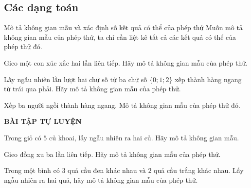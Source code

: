 \subsection{Các dạng toán}
\begin{dang}{Mô tả không gian mẫu và xác định số kết quả có thể của phép thử}
Muốn mô tả không gian mẫu của phép thử, ta chỉ cần liệt kê tất cả các kết quả có thể của phép thử đó.
\end{dang}

\begin{vd}%
Gieo một con xúc xắc hai lần liên tiếp. Hãy mô tả không gian mẫu của phép thử.
\end{vd}

\begin{vd}%
Lấy ngẫu nhiên lần lượt hai chữ số từ ba chữ số $\{0;1;2\}$ xếp thành hàng ngang từ trái qua phải. Hãy mô tả không gian mẫu của phép thử.
\end{vd}

\begin{vd}%
Xếp ba người ngồi thành hàng ngang. Mô tả không gian mẫu của phép thử đó.
\end{vd}

\begin{center}
\textbf{BÀI TẬP TỰ LUYỆN}
\end{center}
\begin{bt}%
Trong giỏ có $5$ củ khoai, lấy ngẫu nhiên ra hai củ. Hãy mô tả không gian mẫu.
\end{bt}

\begin{bt}%
Gieo đồng xu ba lần liên tiếp. Hãy mô tả không gian mẫu của phép thử.
\end{bt}

\begin{bt}%
Trong một bình có $3$ quả cầu đen khác nhau và $2$ quả cầu trắng khác nhau. Lấy ngẫu nhiên ra hai quả, hãy mô tả không gian mẫu của phép thử.
\end{bt}

